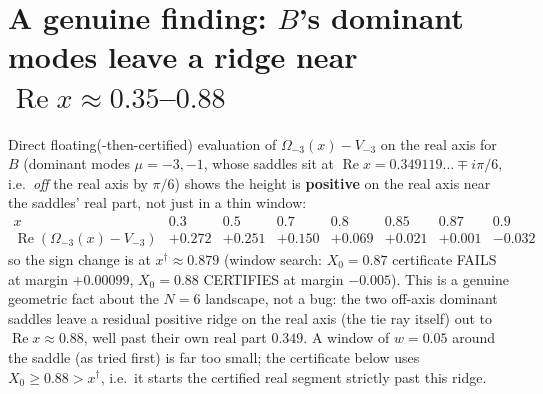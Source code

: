 \documentclass[11pt]{article}
\begin{document}
\section{A genuine finding: $B$'s dominant modes leave a ridge near $\operatorname{Re}x\approx0.35$--$0.88$}
Direct floating(-then-certified) evaluation of $\Omega_{-3}(x)-V_{-3}$ on the real axis for $B$ (dominant
modes $\mu=-3,-1$, whose saddles sit at $\operatorname{Re}x=0.349119\ldots\mp i\pi/6$, i.e.\ \emph{off}
the real axis by $\pi/6$) shows the height is \textbf{positive} on the real axis near the saddles' real
part, not just in a thin window:
\[
\begin{array}{c|ccccccc}
x & 0.3 & 0.5 & 0.7 & 0.8 & 0.85 & 0.87 & 0.9\\\hline
\operatorname{Re}(\Omega_{-3}(x)-V_{-3}) & +0.272 & +0.251 & +0.150 & +0.069 & +0.021 & +0.001 & -0.032
\end{array}
\]
so the sign change is at $x^\dagger\approx0.879$ (window search: $X_0=0.87$ certificate FAILS at margin
$+0.00099$, $X_0=0.88$ CERTIFIES at margin $-0.005$). This is a genuine geometric fact about the $N=6$
landscape, not a bug: the two off-axis dominant saddles leave a residual positive ridge on the real axis
(the tie ray itself) out to $\operatorname{Re}x\approx0.88$, well past their own real part $0.349$. A
window of $w=0.05$ around the saddle (as tried first) is far too small; the certificate below uses
$X_0\ge0.88>x^\dagger$, i.e.\ it starts the certified real segment strictly past this ridge.
\end{document}

